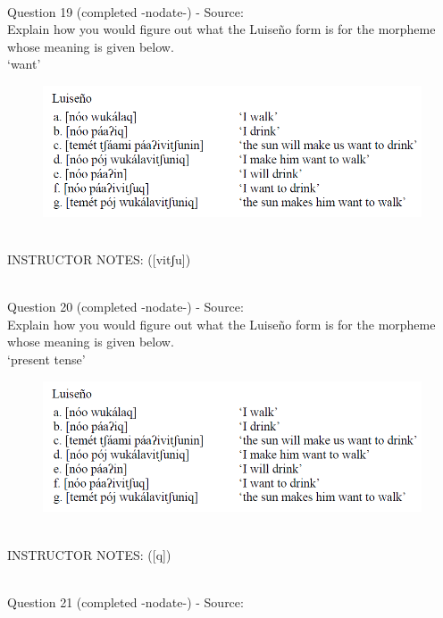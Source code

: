 \documentclass[12pt]{article}
\begin{document}
~\\

{\large Question 19} (completed -nodate-) - Source: \\

Explain how you would figure out what the Luiseño form is for the morpheme whose meaning is given below.\\

‘want’

\begin{figure}[H]
\includegraphics{../images/luiseno.png}
\end{figure}

~\\
INSTRUCTOR NOTES: ([vitʃu])


~\\

{\large Question 20} (completed -nodate-) - Source: \\

Explain how you would figure out what the Luiseño form is for the morpheme whose meaning is given below.\\

‘present tense’

\begin{figure}[H]
\includegraphics{../images/luiseno.png}
\end{figure}

~\\
INSTRUCTOR NOTES: ([q])


~\\

{\large Question 21} (completed -nodate-) - Source: \\
\end{document}
